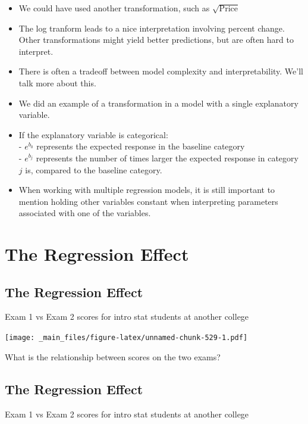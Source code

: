\documentclass[]{book}
\begin{document}
\begin{itemize}
\item
  We could have used another transformation, such as
  \(\sqrt{\text{Price}}\)
\item
  The log tranform leads to a nice interpretation involving percent
  change. Other transformations might yield better predictions, but are
  often hard to interpret.
\item
  There is often a tradeoff between model complexity and
  interpretability. We'll talk more about this.
\item
  We did an example of a transformation in a model with a single
  explanatory variable.
\item
  If the explanatory variable is categorical:\\
  - \(e^{b_0}\) represents the expected response in the baseline
  category\\
  - \(e^{b_j}\) represents the number of times larger the expected
  response in category \(j\) is, compared to the baseline category.
\item
  When working with multiple regression models, it is still important to
  mention holding other variables constant when interpreting parameters
  associated with one of the variables.
\end{itemize}

\section{The Regression Effect}\label{the-regression-effect}

\subsection{The Regression Effect}\label{the-regression-effect-1}

Exam 1 vs Exam 2 scores for intro stat students at another college

\texttt{[image: \_main\_files/figure-latex/unnamed-chunk-529-1.pdf]}

What is the relationship between scores on the two exams?

\subsection{The Regression Effect}\label{the-regression-effect-2}

Exam 1 vs Exam 2 scores for intro stat students at another college
\end{document}

